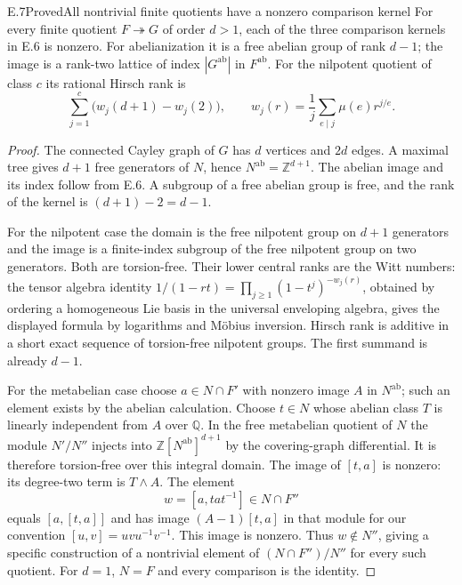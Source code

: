 \begin{statement}{E.7}{Proved}{All nontrivial finite quotients have a nonzero comparison kernel}
For every finite quotient $F\twoheadrightarrow G$ of order $d>1$,
each of the three comparison kernels in E.6 is nonzero.
For abelianization it is a free abelian group of rank $d-1$;
the image is a rank-two lattice of index $|G^{\mathrm{ab}}|$ in
$F^{\mathrm{ab}}$. For the nilpotent quotient of class $c$ its
rational Hirsch rank is
\[
 \sum_{j=1}^c\bigl(w_j(d+1)-w_j(2)\bigr),\qquad
 w_j(r)=\frac1j\sum_{e\mid j}\mu(e)r^{j/e}.
\]
\end{statement}
\begin{proof}
The connected Cayley graph of $G$ has $d$ vertices and $2d$ edges.
A maximal tree gives $d+1$ free generators of $N$, hence
$N^{\mathrm{ab}}=\mathbb Z^{d+1}$. The abelian image and its index
follow from E.6. A subgroup of a free abelian group is free, and
the rank of the kernel is $(d+1)-2=d-1$.

For the nilpotent case the domain is the free nilpotent group on
$d+1$ generators and the image is a finite-index subgroup of the
free nilpotent group on two generators. Both are torsion-free.
Their lower central ranks are the Witt numbers: the tensor algebra
identity $1/(1-rt)=\prod_{j\geq1}(1-t^j)^{-w_j(r)}$, obtained by
ordering a homogeneous Lie basis in the universal enveloping
algebra, gives the displayed formula by logarithms and M\"obius
inversion. Hirsch rank is additive in a short exact sequence of
torsion-free nilpotent groups. The first summand is already $d-1$.

For the metabelian case choose
$a\in N\cap F'$ with nonzero image $A$ in $N^{\mathrm{ab}}$;
such an element exists by the abelian calculation. Choose $t\in N$
whose abelian class $T$ is linearly independent from $A$ over
$\mathbb Q$. In the free metabelian quotient of $N$ the module
$N'/N''$ injects into $\mathbb Z[N^{\mathrm{ab}}]^{d+1}$ by the
covering-graph differential. It is therefore torsion-free over this
integral domain. The image of $[t,a]$ is nonzero: its degree-two
term is $T\wedge A$. The element
\[
 w=[a,tat^{-1}]\in N\cap F''
\]
equals $[a,[t,a]]$ and has image $(A-1)[t,a]$ in that module
for our convention $[u,v]=uvu^{-1}v^{-1}$. This image is nonzero.
Thus $w\notin N''$, giving a specific construction of a nontrivial
element of $(N\cap F'')/N''$ for every such quotient.
For $d=1$, $N=F$ and every comparison is the identity.
\end{proof}

